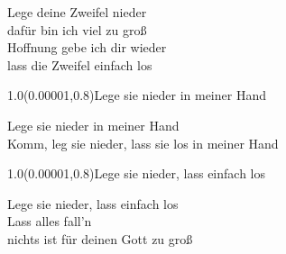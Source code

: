 \documentclass[aspectratio=169]{beamer}
\begin{document}
\begin{frame}
\centering
\color{white}
\huge{Lege deine Zweifel nieder} \\
\huge{dafür bin ich viel zu groß} \\
\huge{Hoffnung gebe ich dir wieder} \\
\huge{lass die Zweifel einfach los} \\

\begin{textblock}{1.0}(0.00001,0.8)\color{gray}\normalsize{Lege sie nieder in meiner Hand}\end{textblock}
\end{frame}

\begin{frame}
\centering
\color{white}
\huge{Lege sie nieder in meiner Hand} \\
\huge{Komm, leg sie nieder, lass sie los in meiner Hand} \\

\begin{textblock}{1.0}(0.00001,0.8)\color{gray}\normalsize{Lege sie nieder, lass einfach los}\end{textblock}
\end{frame}

\begin{frame}
\centering
\color{white}
\huge{Lege sie nieder, lass einfach los} \\
\huge{Lass alles fall'n} \\
\huge{nichts ist für deinen Gott zu groß} \\
\end{frame}
\end{document}
